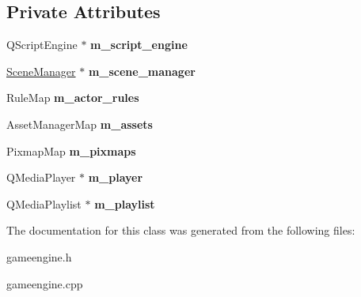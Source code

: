\subsection*{Private Attributes}
\begin{DoxyCompactItemize}
\item 
\mbox{\label{classmfg_1_1_engine_ad2401d178403008525cfd6a1caa85ae5}} 
Q\+Script\+Engine $\ast$ {\bfseries m\+\_\+script\+\_\+engine}
\item 
\mbox{\label{classmfg_1_1_engine_a24bac160b2daf5247d6b5d70499311f6}} 
\hyperlink{class_scene_manager}{Scene\+Manager} $\ast$ {\bfseries m\+\_\+scene\+\_\+manager}
\item 
\mbox{\label{classmfg_1_1_engine_a8b648c4f7a59c9993a30179b4711c92b}} 
Rule\+Map {\bfseries m\+\_\+actor\+\_\+rules}
\item 
\mbox{\label{classmfg_1_1_engine_a18f50fe08592b70969ff6c8113f18753}} 
Asset\+Manager\+Map {\bfseries m\+\_\+assets}
\item 
\mbox{\label{classmfg_1_1_engine_ab9813b744a07242fc2a3adc7d796cd20}} 
Pixmap\+Map {\bfseries m\+\_\+pixmaps}
\item 
\mbox{\label{classmfg_1_1_engine_ac423142f783829c549531219290966e2}} 
Q\+Media\+Player $\ast$ {\bfseries m\+\_\+player}
\item 
\mbox{\label{classmfg_1_1_engine_ae6f5890f6e9a33a6891957e671fbf41c}} 
Q\+Media\+Playlist $\ast$ {\bfseries m\+\_\+playlist}
\end{DoxyCompactItemize}


The documentation for this class was generated from the following files\+:\begin{DoxyCompactItemize}
\item 
gameengine.\+h\item 
gameengine.\+cpp\end{DoxyCompactItemize}
